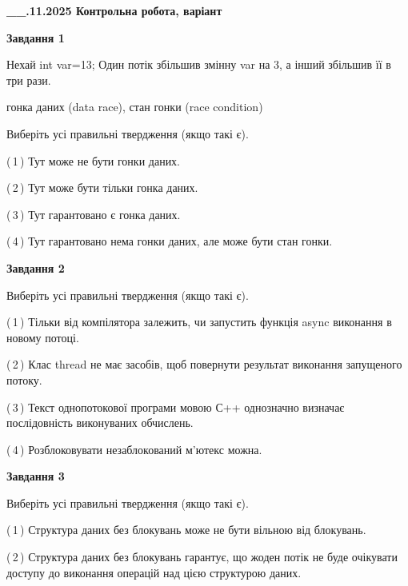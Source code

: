 \documentclass[12pt, ukrainian]{article}
\begin{document}
\begin {large}

\textbf{\_\_.11.2025 Контрольна робота, варіант  }\par


{

\begin{center}
\textbf{Завдання 1}
\end{center}
Нехай int var=13; Один потік збільшив змінну var на 3, а інший збільшив її в три рази.

гонка даних (data race), стан гонки (race condition)

Виберіть усі правильні твердження (якщо такі є).\par
\vspace{2mm}
(\,1\,) Тут може не бути гонки даних.%

(\,2\,) Тут може бути тільки гонка даних.%

(\,3\,) Тут гарантовано є гонка даних.%

(\,4\,) Тут гарантовано нема гонки даних, але може бути стан гонки.%



\begin{center}
\textbf{Завдання 2}
\end{center}
Виберіть усі правильні твердження (якщо такі є).\par
\vspace{2mm}

(\,1\,) Тільки від компілятора залежить, чи запустить функція async виконання в новому потоці.%

(\,2\,) Клас thread не має засобів, щоб повернути результат виконання запущеного потоку.%

(\,3\,) Текст однопотокової програми мовою С++ однозначно визначає послідовність виконуваних обчислень.%

(\,4\,) Розблоковувати незаблокований м’ютекс можна.%



\begin{center}
\textbf{Завдання 3}
\end{center}
Виберіть усі правильні твердження (якщо такі є).\par
\vspace{2mm}

(\,1\,) Структура даних без блокувань може не бути вільною від блокувань.%

(\,2\,) Структура даних без блокувань гарантує, що жоден потік не буде очікувати доступу до виконання операцій над цією структурою даних.%

}
\end{large}
\end{document}
